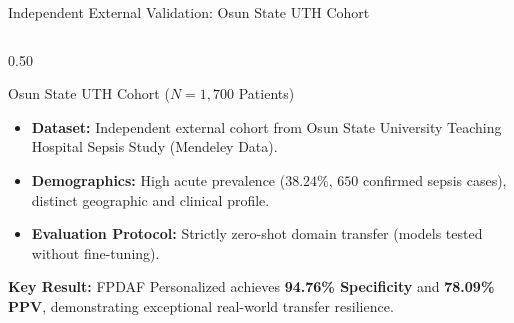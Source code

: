 \documentclass[aspectratio=169, 10pt]{beamer}
\begin{document}
\begin{frame}{Independent External Validation: Osun State UTH Cohort}
    \begin{columns}
        \begin{column}{0.50\textwidth}
            \begin{block}{Osun State UTH Cohort ($N=1,700$ Patients)}
                \scriptsize
                \begin{itemize}
                    \item \textbf{Dataset:} Independent external cohort from Osun State University Teaching Hospital Sepsis Study (Mendeley Data).
                    \item \textbf{Demographics:} High acute prevalence ($38.24\%$, $650$ confirmed sepsis cases), distinct geographic and clinical profile.
                    \item \textbf{Evaluation Protocol:} Strictly zero-shot domain transfer (models tested without fine-tuning).
                \end{itemize}
            \end{block}
            
            \begin{table}
                \centering
                \scriptsize
                \renewcommand{\arraystretch}{1.15}
            \end{table}
            \scriptsize \textbf{Key Result:} FPDAF Personalized achieves \textbf{94.76\% Specificity} and \textbf{78.09\% PPV}, demonstrating exceptional real-world transfer resilience.
        \end{column}
        

\end{columns}
\end{frame}
\end{document}
